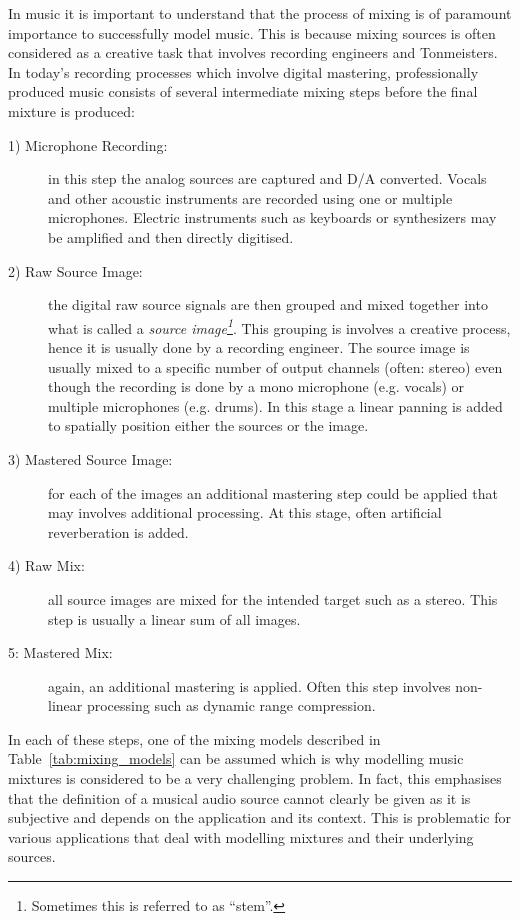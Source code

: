In music it is important to understand that the process of mixing is of paramount importance to successfully model music.
This is because mixing sources is often considered as a creative task that involves recording engineers and Tonmeisters.
In today's recording processes which involve digital mastering, professionally produced music consists of several intermediate mixing steps before the final mixture is produced:

\begin{description}
  \item[1) Microphone Recording:] in this step the analog sources are captured and D/A converted. Vocals and other acoustic instruments are recorded using one or multiple microphones.
  Electric instruments such as keyboards or synthesizers may be amplified and then directly digitised.
  \item[2) Raw Source Image:] the digital raw source signals are then grouped and mixed together into what is called a \emph{source image\footnote{Sometimes this is referred to as ``stem''.}}.
  This grouping is involves a creative process, hence it is usually done by a recording engineer.
  The source image is usually mixed to a specific number of output channels (often: stereo) even though the recording is done by a mono microphone (e.g. vocals) or multiple microphones (e.g. drums).
  In this stage a linear panning is added to spatially position either the sources or the image.
  \item[3) Mastered Source Image:] for each of the images an additional mastering step could be applied that may involves additional processing.
  At this stage, often artificial reverberation is added.
  \item[4) Raw Mix:] all source images are mixed for the intended target such as a stereo.
  This step is usually a linear sum of all images.
  \item[5: Mastered Mix:] again, an additional mastering is applied.
  Often this step involves non-linear processing such as dynamic range compression.
\end{description}

In each of these steps, one of the mixing models described in Table~\ref{tab:mixing_models} can be assumed which is why modelling music mixtures is considered to be a very challenging problem.
In fact, this emphasises that the definition of a musical audio source cannot clearly be given as it is subjective and depends on the application and its context.
This is problematic for various applications that deal with modelling mixtures and their underlying sources.


